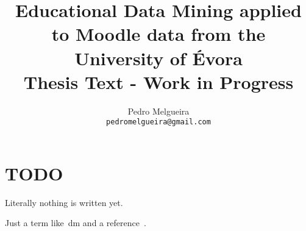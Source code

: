 \documentclass[12pt]{report}
\title{Educational Data Mining applied to Moodle data from the University of
Évora
\\
\large Thesis Text - Work in Progress}
\author{Pedro Melgueira\\
    \small{\texttt{pedromelgueira@gmail.com}}
}
\date{}
\begin{document}
\maketitle

\tableofcontents
\listoffigures
\listoftables

\chapter{TODO}

Literally nothing is written yet.

Just a term like~\gls{dm} and a reference~\cite{ind_001}.

\printglossary



\end{document}
